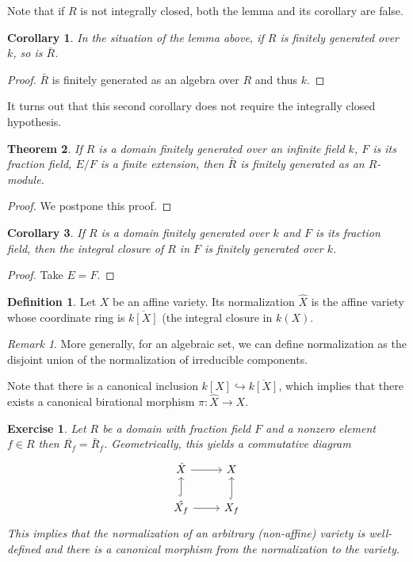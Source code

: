 \documentclass{article}
\theoremstyle{plain}
\newtheorem{thm}{Theorem}
\newtheorem{cor}[thm]{Corollary}
\newtheorem{exc}{Exercise}
\theoremstyle{definition}
\newtheorem{defn}{Definition}
\theoremstyle{remark}
\newtheorem*{rem}{Remark}
\begin{document}
Note that if $R$ is not integrally closed, both the lemma and
its corollary are false.

\begin{cor}
    In the situation of the lemma above, if $R$ is finitely generated
    over $k$, so is $\bar R$.
\end{cor}
\begin{proof}
    $\bar R$ is finitely generated as an algebra over $R$ and thus $k$.
\end{proof}

It turns out that this second corollary does not require the integrally
closed hypothesis.

\begin{thm}
    If $R$ is a domain finitely generated over an infinite field $k$,
    $F$ is its fraction field, $E/F$ is a finite extension, then $\bar R$
    is finitely generated as an $R$-module.
\end{thm}
\begin{proof}
    We postpone this proof.
\end{proof}

\begin{cor}
    If $R$ is a domain finitely generated over $k$ and $F$ is its fraction
    field, then the integral closure of $R$ in $F$ is finitely generated over $k$.
\end{cor}
\begin{proof}
    Take $E=F$.
\end{proof}

\begin{defn}
    Let $X$ be an affine variety. Its normalization $\hat X$ is the affine
    variety whose coordinate ring is $\overline{k[X]}$ (the integral
    closure in $k(X)$.
\end{defn}

\begin{rem}
    More generally, for an algebraic set, we can define normalization as the
    disjoint union of the normalization of irreducible components.
\end{rem}

Note that there is a canonical inclusion $k[X]\hookrightarrow\overline{k[X]}$,
which implies that there exists a canonical birational morphism $\pi:\hat X\to X$.

\begin{exc}
    Let $R$ be a domain with fraction field $F$ and a nonzero element $f\in R$
    then $\overline{R_f}=\bar R_{f}$. Geometrically, this yields a commutative diagram
    \begin{equation*}
        \begin{tikzcd}
            \hat X\ar{r} & X\\
            \hat{X_f}\ar{r}\ar[hook]{u} & X_f\ar[hook]{u}
        \end{tikzcd}
    \end{equation*}
    This implies that the normalization of an arbitrary (non-affine) variety
    is well-defined and there is a canonical morphism from the normalization to
    the variety.
\end{exc}
\end{document}
